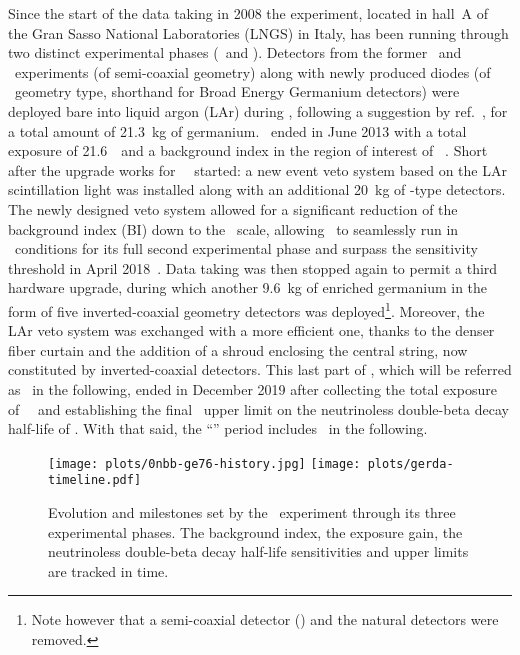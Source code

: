 Since the start of the data taking in 2008 the experiment, located in hall~A of the Gran
Sasso National Laboratories (LNGS) in Italy, has been running through two distinct
experimental phases (\phaseone\ and \phasetwo). Detectors from the former \hdm\ and \igex\
experiments (of semi-coaxial geometry) along with newly produced diodes (of \bege\
geometry type, shorthand for Broad Energy Germanium detectors) were deployed bare into
liquid argon (LAr) during \phaseone, following a suggestion by ref.~\cite{Heusser1995},
for a total amount of 21.3~kg of germanium. \phaseone\ ended in June 2013 with a total
exposure of 21.6~\kgyr\ and a background index in the region of interest of
\pIbi~\cite{Agostini2016}.  Short after the upgrade works for \gerda\ \phasetwo\ started:
a new event veto system based on the LAr scintillation light was installed along with an
additional 20~kg of \bege-type detectors.  The newly designed veto system allowed for a
significant reduction of the background index (BI) down to the \vctsper\ scale, allowing
\gerda\ to seamlessly run in \bkgfree\ conditions for its full second experimental phase
and surpass the \powtenyr{26} sensitivity threshold in April 2018~\cite{Agostini2019a}.
Data taking was then stopped again to permit a third hardware upgrade, during which
another 9.6~kg of enriched germanium in the form of five inverted-coaxial geometry
detectors was deployed\footnote{Note however that a semi-coaxial detector (\ANG{1}) and
the natural \GTF{} detectors were removed.}. Moreover, the LAr veto system was exchanged
with a more efficient one, thanks to the denser fiber curtain and the addition of a shroud
enclosing the central string, now constituted by inverted-coaxial detectors. This last
part of \phasetwo, which will be referred as \phasetwop\ in the following, ended in
December 2019 after collecting the total exposure of \fillme{fillme}~\kgyr\ and
establishing the final \gerda\ upper limit on the neutrinoless double-beta decay half-life
of \gerdafinallimit. With that said, the ``\phasetwo'' period includes \phasetwop\ in the
following.

\begin{figure}
  \centering
  \texttt{[image: plots/0nbb-ge76-history.jpg]}
  \texttt{[image: plots/gerda-timeline.pdf]}
  \caption{%
    Evolution and milestones set by the \gerda\ experiment through its three experimental
    phases. The background index, the exposure gain, the neutrinoless double-beta decay
    half-life sensitivities and upper limits are tracked in time.
  }
\end{figure}

